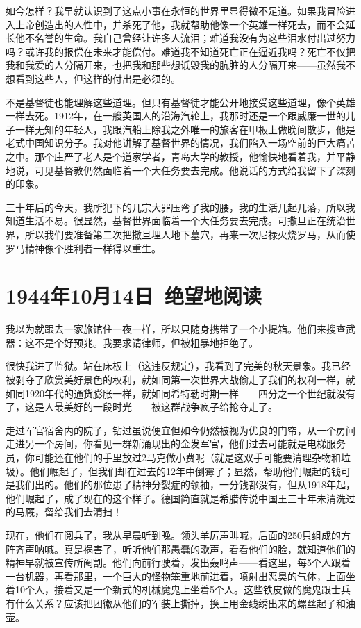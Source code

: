 \documentclass[UTF8]{ctexart}
\begin{document}
如今怎样？我早就认识到了这点小事在永恒的世界里显得微不足道。如果我冒险进入上帝创造出的人性中，并杀死了他，我就帮助他像一个英雄一样死去，而不会延长他不名誉的生命。我自己曾经让许多人流泪；难道我没有为这些泪水付出过努力吗？或许我的报偿在未来才能偿付。难道我不知道死亡正在逼近我吗？死亡不仅把我和我爱的人分隔开来，也把我和那些想诋毁我的肮脏的人分隔开来——虽然我不想看到这些人，但这样的付出是必须的。

不是基督徒也能理解这些道理。但只有基督徒才能公开地接受这些道理，像个英雄一样去死。1912年，在一艘英国人的沿海汽轮上，我那时还是一个跟威廉一世的儿子一样无知的年轻人，我跟汽船上除我之外唯一的旅客在甲板上做晚间散步，他是老式中国知识分子。我对他讲解了基督世界的情况，我们陷入一场空前的巨大痛苦之中。那个庄严了老人是个道家学者，青岛大学的教授，他愉快地看着我，并平静地说，可见基督教仍然面临着一个大任务要去完成。他说话的方式给我留下了深刻的印象。

三十年后的今天，我所犯下的几宗大罪压弯了我的腰，我的生活几起几落，所以我知道生活不易。很显然，基督世界面临着一个大任务要去完成。可撒旦正在统治世界，所以我们要准备第二次把撒旦埋人地下墓穴，再来一次尼禄火烧罗马，从而使罗马精神像个胜利者一样得以重生。

\section{1944年10月14日\ 绝望地阅读}

我以为就跟去一家旅馆住一夜一样，所以只随身携带了一个小提箱。他们来搜查武器：这不是个好预兆。我要求请律师，但被粗暴地拒绝了。

很快我进了监狱。站在床板上（这违反规定），我看到了完美的秋天景象。我已经被剥夺了欣赏美好景色的权利，就如同第一次世界大战偷走了我们的权利一样，就如同1920年代的通货膨胀一样，就如同希特勒时期一样——四分之一个世纪就没有了，这是人最美好的一段时光——被这群战争疯子给抢夺走了。

走过军官宿舍内的院子，钻过虽说便宜但如今仍然被视为优良的门帘，从一个房间走进另一个房间，你看见一群新涌现出的金发军官，他们过去可能就是电梯服务员，你可能还在他们的手里放过2马克做小费呢（就是这双手可能要清理杂物和垃圾）。他们崛起了，但我们却在过去的12年中倒霉了；显然，帮助他们崛起的钱可是我们出的。他们的那位患了精神分裂症的领袖，一分钱都没有，但从1918年起，他们崛起了，成了现在的这个样子。德国简直就是希腊传说中国王三十年未清洗过的马厩，留给我们去清扫！

现在，他们在阅兵了，我从早晨听到晚。领头羊厉声叫喊，后面的250只组成的方阵齐声呐喊。真是祸害了，听听他们那愚蠢的歌声，看看他们的脸，就知道他们的精神早就被宣传所阉割。他们向前行驶着，发出轰鸣声——看这里，每5个人跟着一台机器，再看那里，一个巨大的怪物笨重地前进着，喷射出恶臭的气体，上面坐着10个人，接着又是一个新式的机械魔鬼上坐着5个人。这些铁皮做的魔鬼跟士兵有什么关系？应该把团徽从他们的军装上撕掉，换上用金线绣出来的螺丝起子和油壶。
\end{document}
